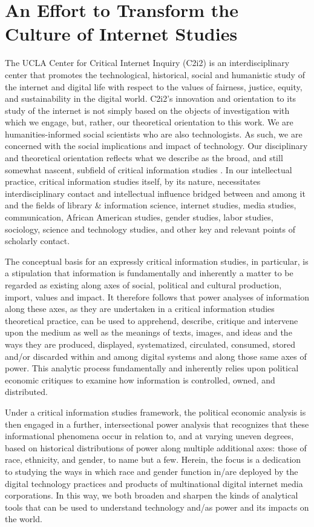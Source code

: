 \documentclass[11pt]{article}
\begin{document}
\section{An Effort to Transform the Culture of Internet Studies}
The UCLA Center for Critical Internet Inquiry (C2i2) is an interdisciplinary center that promotes the technological, historical, social and humanistic study of the internet and digital life with respect to the values of fairness, justice, equity, and sustainability in the digital world. C2i2’s innovation and orientation to its study of the internet is not simply based on the objects of investigation with which we engage, but, rather, our theoretical orientation to this work. We are humanities-informed social scientists who are also technologists. As such, we are concerned with the social implications and impact of technology. Our disciplinary and theoretical orientation reflects what we describe as the broad, and still somewhat nascent, subfield of critical information studies \cite{vaidhyanathan2006afterword}. In our intellectual practice, critical information studies itself, by its nature, necessitates interdisciplinary contact and intellectual influence bridged between and among it and the fields of library \& information science, internet studies, media studies, communication, African American studies, gender studies, labor studies, sociology, science and technology studies, and other key and relevant points of scholarly contact. 

The conceptual basis for an expressly critical information studies, in particular, is a stipulation that information is fundamentally and inherently a matter to be regarded as existing along axes of social, political and cultural production, import, values and impact. It therefore follows that power analyses of information along these axes, as they are undertaken in a critical information studies theoretical practice, can be used to apprehend, describe, critique and intervene upon the medium as well as the meanings of texts, images, and ideas and the ways they are produced, displayed, systematized, circulated, consumed, stored and/or discarded within and among digital systems and along those same axes of power. This analytic process fundamentally and inherently relies upon political economic critiques to examine how information is controlled, owned, and distributed. 

Under a critical information studies framework, the political economic analysis is then engaged in a further, intersectional power analysis that recognizes that these informational phenomena occur in relation to, and at varying uneven degrees, based on historical distributions of power along multiple additional axes: those of race, ethnicity, and gender, to name but a few. Herein, the focus is a dedication to studying the ways in which race and gender function in/are deployed by the digital technology practices and products of multinational digital internet media corporations. In this way, we both broaden and sharpen the kinds of analytical tools that can be used to understand technology and/as power and its impacts on the world.
\end{document}
